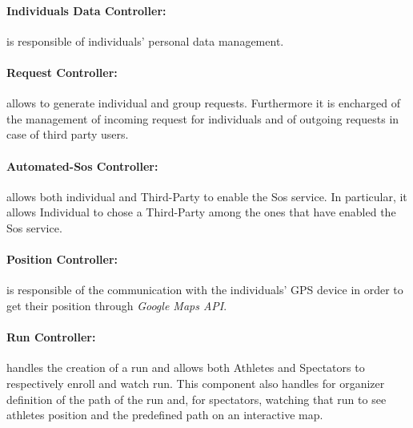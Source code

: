 \documentclass[a4paper]{article}
\begin{document}
    \paragraph{Individuals Data Controller:}
    is responsible of individuals' personal data management.
    
    \paragraph{Request Controller:}
    allows to generate individual and group requests. Furthermore it is encharged of the management of incoming request for individuals and of outgoing requests in case of third party users.
    
    \paragraph{Automated-Sos Controller:}
    allows both individual and Third-Party to enable the Sos service. In particular, it allows Individual to chose a Third-Party among the ones that have enabled the Sos service.
    
    \paragraph{Position Controller:}
    is responsible of the communication with the individuals' GPS device in order to get their position through \textit{Google Maps API}.

    \paragraph{Run Controller:}
    handles the creation of a run and allows both Athletes and Spectators to respectively enroll and watch run. This component also handles for organizer definition of the path of the run and, for spectators, watching that run to see athletes position and the predefined path on an interactive map.
\end{document}
